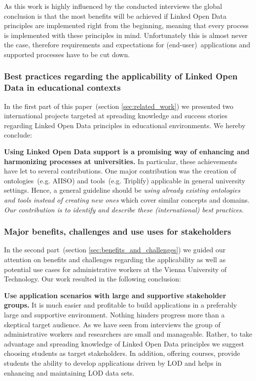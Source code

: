 \documentclass{article}
\begin{document}
As this work is highly influenced by the conducted interviews the global conclusion is that the most benefits will be achieved if Linked Open Data principles are implemented right from the beginning, meaning that every process is implemented with these principles in mind. Unfortunately this is almost never the case, therefore requirements and expectations for (end-user)~applications and supported processes have to be cut down. 

\subsubsection{Best practices regarding the applicability of Linked Open Data in educational contexts}
In the first part of this paper~(section \ref{sec:related_work}) we presented two international projects targeted at spreading knowledge and success stories regarding Linked Open Data principles in educational environments. We hereby conclude:


\textbf{Using Linked Open Data support is a promising way of enhancing and harmonizing processes at universities.}
In particular, these achievements have let to several contributions. One major contribution was the creation of ontologies~(e.g. AIISO) and tools~(e.g. Triplify) applicable in general university settings. 
Hence, a general guideline should be \textit{using already existing ontologies and tools instead of creating new ones} which cover similar concepts and domains.\\

\textit{Our contribution is to identify and describe these (international) best practices.}

\subsubsection{Major benefits, challenges and use uses for stakeholders}
In the second part~(section \ref{sec:benefits_and_challenges}) we guided our attention on benefits and challenges regarding the applicability as well as
potential use cases for administrative workers at the Vienna University of Technology. 
Our work resulted in the following conclusion:

\textbf{Use application scenarios with large and supportive stakeholder groups.}
It is much easier and profitable to build applications in a preferably large and supportive environment. Nothing hinders progress more than a skeptical target audience. 
As we have seen from interviews the group of administrative workers and researchers are small and manageable. Rather, to take advantage and spreading knowledge of Linked Open Data principles we suggest choosing students as target stakeholders. In addition, offering courses, provide students the ability to develop applications driven by LOD and helps in enhancing and maintaining LOD data sets. \\
\end{document}
